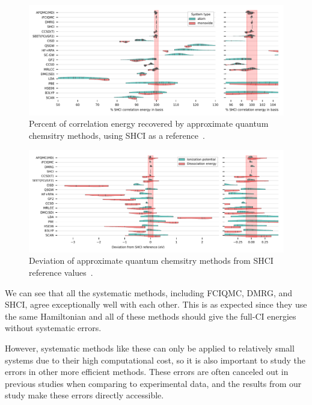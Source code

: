 \begin{figure}
  \begin{center}
  \includegraphics[width=\linewidth]{figs/correlation_energybar.pdf}
  \caption{Percent of correlation energy recovered by approximate quantum chemsitry methods, using SHCI as a reference~\cite{williams2019direct}.
}
  \label{fig:benchmark}
  \end{center}
\end{figure}

\begin{figure}
  \begin{center}
  \includegraphics[width=\linewidth]{figs/BE_IP_SHCI.pdf}
  \caption{Deviation of approximate quantum chemsitry methods from SHCI reference values~\cite{williams2019direct}.
}
  \label{fig:benchmark_be}
  \end{center}
\end{figure}

We can see that all the systematic methods, including FCIQMC, DMRG, and SHCI, agree exceptionally well with each other.
This is as expected since they use the same Hamiltonian and all of these methods should give the full-CI energies without systematic errors.

However, systematic methods like these can only be applied to relatively small systems due to their high computational cost, so it is also important to study the errors in other more efficient methods.
These errors are often canceled out in previous studies when comparing to experimental data, and the results from our study make these errors directly accessible.

